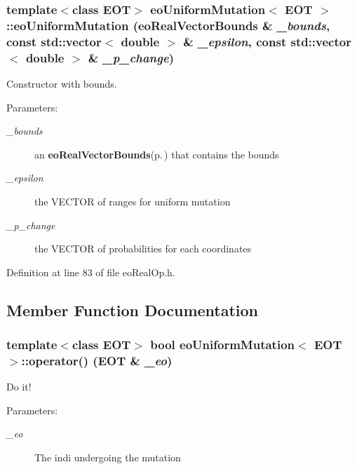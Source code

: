 \subsubsection{\setlength{\rightskip}{0pt plus 5cm}template$<$class EOT$>$ {\bf eo\-Uniform\-Mutation}$<$ {\bf EOT} $>$::{\bf eo\-Uniform\-Mutation} ({\bf eo\-Real\-Vector\-Bounds} \& {\em \_\-bounds}, const std::vector$<$ double $>$ \& {\em \_\-epsilon}, const std::vector$<$ double $>$ \& {\em \_\-p\_\-change})\hspace{0.3cm}{\tt  [inline]}}\label{classeo_uniform_mutation_a2}


Constructor with bounds. 

\begin{Desc}
\item[Parameters:]
\begin{description}
\item[{\em \_\-bounds}]an {\bf eo\-Real\-Vector\-Bounds}{\rm (p.\,\pageref{classeo_real_vector_bounds})} that contains the bounds \item[{\em \_\-epsilon}]the VECTOR of ranges for uniform mutation \item[{\em \_\-p\_\-change}]the VECTOR of probabilities for each coordinates \end{description}
\end{Desc}


Definition at line 83 of file eo\-Real\-Op.h.

\subsection{Member Function Documentation}
\subsubsection{\setlength{\rightskip}{0pt plus 5cm}template$<$class EOT$>$ bool {\bf eo\-Uniform\-Mutation}$<$ {\bf EOT} $>$::operator() ({\bf EOT} \& {\em \_\-eo})\hspace{0.3cm}{\tt  [inline, virtual]}}\label{classeo_uniform_mutation_a4}


Do it! 

\begin{Desc}
\item[Parameters:]
\begin{description}
\item[{\em \_\-eo}]The indi undergoing the mutation \end{description}
\end{Desc}



